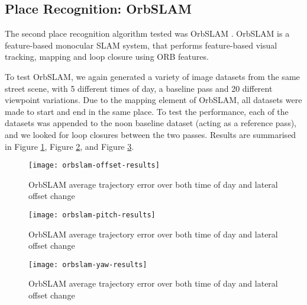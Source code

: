 \documentclass[letterpaper, 10 pt, conference]{ieeeconf}  %
\begin{document}


\subsection{Place Recognition: OrbSLAM}

The second place recognition algorithm tested was OrbSLAM \cite{Montiel2015}. OrbSLAM is a feature-based monocular SLAM system, that performs feature-based visual tracking, mapping and loop closure using ORB features.

To test OrbSLAM, we again generated a variety of image datasets from the same street scene, with 5 different times of day, a baseline pass and 20 different viewpoint variations. Due to the mapping element of OrbSLAM, all datasets were made to start and end in the same place. To test the performance, each of the datasets was appended to the noon baseline dataset (acting as a reference pass), and we looked for loop closures between the two passes. Results are summarised in Figure \ref{fig:orbslam-results-offset}, Figure \ref{fig:orbslam-results-pitch}, and Figure \ref{fig:orbslam-results-yaw}.


\begin{figure}[t]
    \texttt{[image: orbslam-offset-results]}
    \caption{OrbSLAM average trajectory error over both time of day and lateral offset change}
    \label{fig:orbslam-results-offset}
\end{figure}

\begin{figure}[t]
    \texttt{[image: orbslam-pitch-results]}
    \caption{OrbSLAM average trajectory error over both time of day and lateral offset change}
    \label{fig:orbslam-results-pitch}
\end{figure}

\begin{figure}[t]
    \texttt{[image: orbslam-yaw-results]}
    \caption{OrbSLAM average trajectory error over both time of day and lateral offset change}
    \label{fig:orbslam-results-yaw}
\end{figure}
\end{document}
